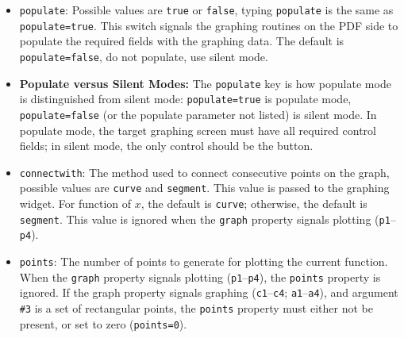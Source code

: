 \documentclass{article}
\begin{document}
\begin{enumerate}
\begin{itemize}
\medskip
\begin{Verbatim}[fontsize=\footnotesize]
    \sgraphLink{type=polar,xInterval={[-1.5,1.5]},yInterval={[-1,2]},
            tInterval={[0,2*PI]},points=40,populate}
            {1+sin(t)}{$r = 1 + \sin(\theta)$ }
\end{Verbatim}
\smallskip

    Note the explicit use of \texttt{type=polar}; the
    parsing can identify a function of $x$ and a set of
    parametric equations that are function of $t$, but help
    is needed for polar.

    \item\texttt{populate}: Possible values are \texttt{true} or
        \texttt{false}, typing \texttt{populate} is the same as
        \texttt{populate=true}. This switch signals the graphing
        routines on the PDF side to populate the required fields
        with the graphing data. The default is \texttt{populate=false}, do not
        populate, use silent mode.

    \item[] \textbf{Populate versus Silent Modes:} The \texttt{populate}
        key is how populate mode is distinguished from silent mode:
        \texttt{populate=true} is populate mode,
        \texttt{populate=false} (or the populate parameter not
        listed) is silent mode. In populate mode, the target
        graphing screen must have all required control fields; in
        silent mode, the only control should be the 
        button.

    \item\texttt{connectwith}: The method used to connect
        consecutive points on the graph, possible values are
        \texttt{curve} and \texttt{segment}. This value is passed to the
        {\AcroFLeX} graphing widget. For function of $x$, the default is
        \texttt{curve}; otherwise, the default is \texttt{segment}. This
        value is ignored when the \texttt{graph} property signals
        plotting (\texttt{p1}--\texttt{p4}).

    \item\texttt{points}: The number of points to generate for
        plotting the current function. When the \texttt{graph}
        property signals plotting (\texttt{p1}--\texttt{p4}), the
        \texttt{points} property is ignored. If the graph property
        signals graphing (\texttt{c1}--\texttt{c4};
        \texttt{a1}--\texttt{a4}), and argument \texttt{\#3} is a
        set of rectangular points, the \texttt{points} property must
        either not be present, or set to zero (\texttt{points=0}).


\end{itemize}
\end{enumerate}
\end{document}
